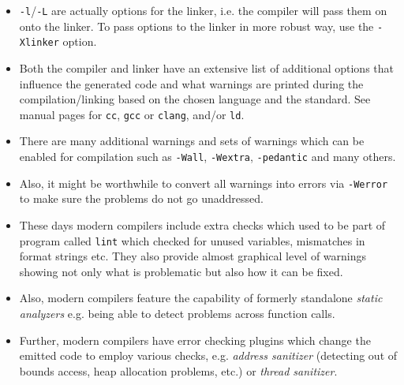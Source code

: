 \begin{itemize}
\item \texttt{-l}/\texttt{-L} are actually options for the linker, i.e. the
compiler will pass them on onto the linker. To pass options to the linker
in more robust way, use the \texttt{-Xlinker} option.
\item Both the compiler and linker have an extensive list of additional options
that influence the generated code and what warnings are printed during the
compilation/linking based on the chosen language and the standard.  See manual
pages for \texttt{cc}, \texttt{gcc} or \texttt{clang}, and/or \texttt{ld}.
\item There are many additional warnings and sets of warnings which can be
enabled for compilation such as \texttt{-Wall}, \texttt{-Wextra},
\texttt{-pedantic} and many others.
\item Also, it might be worthwhile to convert all warnings into errors via
\texttt{-Werror} to make sure the problems do not go unaddressed.
\item These days modern compilers include extra checks which used to be part
of program called \texttt{lint} which checked for unused variables, mismatches
in format strings etc. They also provide almost graphical level of warnings
showing not only what is problematic but also how it can be fixed.
\item Also, modern compilers feature the capability of formerly standalone
\emph{static analyzers} e.g. being able to detect problems across function calls.
\item Further, modern compilers have error checking plugins which change the
emitted code to employ various checks, e.g. \emph{address sanitizer} (detecting
out of bounds access, heap allocation problems, etc.) or \emph{thread sanitizer}.
\end{itemize}



\begin{slide}
\end{slide}

